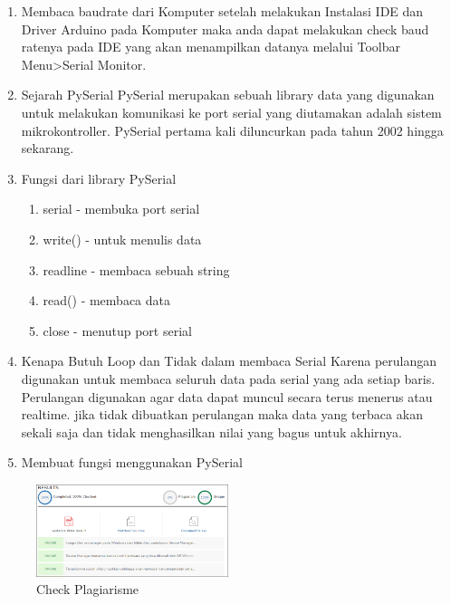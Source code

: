 \begin{enumerate}
\item Membaca baudrate dari Komputer
\subitem setelah melakukan Instalasi IDE dan Driver Arduino pada Komputer maka anda dapat melakukan check baud ratenya pada IDE yang akan menampilkan datanya melalui Toolbar Menu>Serial Monitor.

\item Sejarah PySerial
\subitem PySerial merupakan sebuah library data yang digunakan untuk melakukan komunikasi ke port serial yang diutamakan adalah sistem mikrokontroller. PySerial pertama kali diluncurkan pada tahun 2002 hingga sekarang.

\item Fungsi dari library PySerial
\begin{enumerate}
\item serial - membuka port serial
\item write() - untuk menulis data
\item readline - membaca sebuah string
\item read() - membaca data 
\item close - menutup port serial
\end{enumerate}

\item Kenapa Butuh Loop dan Tidak dalam membaca Serial
\subitem Karena perulangan digunakan untuk membaca seluruh data pada serial yang ada setiap baris. Perulangan digunakan agar data dapat muncul secara terus menerus atau realtime. jika tidak dibuatkan perulangan maka data yang terbaca akan sekali saja dan tidak menghasilkan nilai yang bagus untuk akhirnya.

\item Membuat fungsi menggunakan PySerial

\end{enumerate}

\begin{figure}[!ht]
	\centering
	\includegraphics[width=0.5\textwidth]{figures/chapter5/1164074/1}
	\caption{Check Plagiarisme}
	\label{fig1}
\end{figure}

